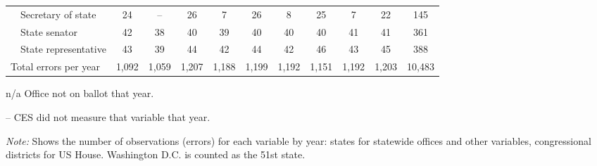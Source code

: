 \begin{table}[!htbp]
{\begin{threeparttable}
\begin{tabular}{lcccccccccc}
~~Secretary of state & 24 & -- & 26 & 7 & 26 & 8 & 25 & 7 & 22 & 145 \\
~~State senator & 42 & 38 & 40 & 39 & 40 & 40 & 40 & 41 & 41 & 361 \\
~~State representative & 43 & 39 & 44 & 42 & 44 & 42 & 46 & 43 & 45 & 388 \\
\midrule
Total errors per year & 1,092 & 1,059 & 1,207 & 1,188 & 1,199 & 1,192 & 1,151 & 1,192 & 1,203 & 10,483 \\
\bottomrule
\end{tabular}
\begin{tablenotes}
\footnotesize
\item n/a Office not on ballot that year.
\item -- CES did not measure that variable that year.
\item \textit{Note:} Shows the number of observations (errors) for each variable by year: states for statewide offices and other variables, congressional districts for US House. Washington D.C. is counted as the 51st state.
\end{tablenotes}
\end{threeparttable}%
}
\end{table}